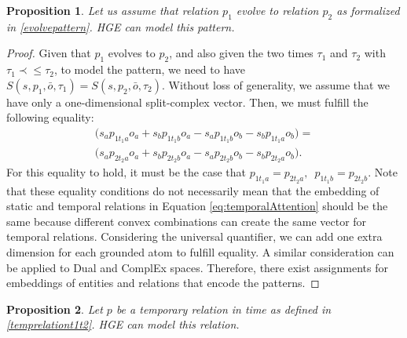 \documentclass[letterpaper]{article} %
\newtheorem{proposition}{Proposition}
\begin{document}
\begin{proposition}
Let us assume that relation $p_1$ evolve to relation $p_2$ as formalized in \ref{evolvepattern}. HGE can model this pattern.
\label{th1:tempevolv}
\end{proposition}
\begin{proof}
Given that $p_1$ evolves to $p_2$, and also given
the two times $\tau_1$ and $\tau_2$ with $\tau_1 \prec\leq \tau_2$,
to model the pattern, we need to have $S(s,p_1,\bar{o},\tau_1) =  S(s,p_2,\bar{o},\tau_2).$
Without loss of generality, we assume that we have only a one-dimensional split-complex vector. Then, we must fulfill the following equality:
\begin{align*}
    \big( s_a p_{1t_1a} o_{a} + s_b p_{1t_1b} o_{a} - s_a p_{1t_1b} o_{b} - s_b p_{1t_1a} o_{b}\big) =  \\
    \big( s_a p_{2t_2a} o_{a} + s_b p_{2t_2b} o_{a} - s_a p_{2t_2b} o_{b} - s_b p_{2t_2a} o_{b}\big).
\end{align*}
For this equality to hold, it must be the case that  $p_{1t_1a} = p_{2t_2a},\,\,\, p_{1t_1b} = p_{2t_2b}$. Note that these equality conditions do not necessarily mean that the embedding of static and temporal relations in Equation \ref{eq:temporalAttention} should be the same because different convex combinations can create the same vector for temporal relations. Considering the  universal quantifier, we can add one extra dimension for each grounded atom to fulfill equality.
A similar consideration can be applied to Dual and ComplEx spaces. Therefore, there exist assignments for embeddings of entities and relations that encode the patterns.
\end{proof}

\begin{proposition}
Let $p$ be a temporary relation in time as defined in \ref{temprelationt1t2}. HGE can model this relation.
\label{th1:tempevolv}
\end{proposition}
\end{document}

